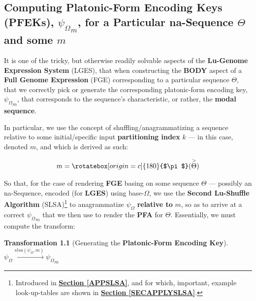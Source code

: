 \documentclass[a4paper, 18pt]{book} %
\newtheorem{trans}{Transformation}
\newcommand{\invpi}{\rotatebox[origin=c]{180}{$\pi$}}
\begin{document}
\begin{appendices}
\chapter{Computing Platonic-Form Encoding Keys (PFEKs), $\boxed{\psi_\Omega}_m$, for a Particular na-Sequence $\Theta$ and some $m$}
\label{SECIFAMSSPFMAPS}


It is one of the tricky, but otherwise readily solvable aspects of the \textbf{Lu-Genome Expression System} (LGES), that when constructing the \textbf{BODY} aspect of a \textbf{Full Genome Expression} (FGE) corresponding to a particular sequence $\Theta$, that we correctly pick or generate the corresponding platonic-form encoding key, $\boxed{\psi_\Omega}_m$, that corresponds to the sequence's characteristic, or rather, the \textbf{modal sequence}. 


In particular, we use the concept of shuffling/anagrammatizing a sequence relative to some initial/specific input \textbf{partitioning index} $k$ --- in this case, denoted $m$, and which is derived as such:

\vspace{1em}
\begin{equation}
 m = \invpi(\overset{>}{\Theta})
\end{equation}
\vspace{1em}

So that, for the case of rendering \textbf{FGE} basing on some sequence $\Theta$ --- possibly an na-Sequence, encoded (for \textbf{LGES}) using base-$\Omega$, we use the \textbf{Second Lu-Shuffle Algorithm} (SLSA)\footnote{Introduced in \textbf{\hyperref[APPSLSA]{Section \ref{APPSLSA}}}, and for which, important, example look-up-tables are shown in \textbf{\hyperref[SECAPPLYSLSA]{Section \ref{SECAPPLYSLSA}}}.} to anagrammatize $\psi_\Omega$ \textbf{relative to} $m$, so as to arrive at a correct $\boxed{\psi_\Omega}_m$ that we then use to render the \textbf{PFA} for $\Theta$. Essentially, we must compute the transform:

\vspace{1em}
\begin{trans}[Generating the \textbf{Platonic-Form Encoding Key}]
$ $\\
$\psi_\Omega \xrightarrow{slsa(\psi_\Omega, m)} \boxed{\psi_\Omega}_m$\\
\end{trans}
\vspace{1em}
 

\end{appendices}
\end{document}
